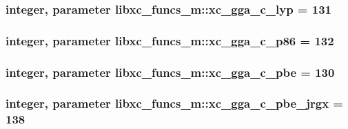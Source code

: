 \hypertarget{classlibxc__funcs__m_a45cb170513b8d6267dfe5b2e2868e75f}{
\subsubsection[{xc\-\_\-gga\-\_\-c\-\_\-lyp}]{\setlength{\rightskip}{0pt plus 5cm}integer, parameter libxc\-\_\-funcs\-\_\-m\-::xc\-\_\-gga\-\_\-c\-\_\-lyp = 131}}\label{classlibxc__funcs__m_a45cb170513b8d6267dfe5b2e2868e75f}
\hypertarget{classlibxc__funcs__m_aedc020b070972d317e7c3eaa07d33b37}{
\subsubsection[{xc\-\_\-gga\-\_\-c\-\_\-p86}]{\setlength{\rightskip}{0pt plus 5cm}integer, parameter libxc\-\_\-funcs\-\_\-m\-::xc\-\_\-gga\-\_\-c\-\_\-p86 = 132}}\label{classlibxc__funcs__m_aedc020b070972d317e7c3eaa07d33b37}
\hypertarget{classlibxc__funcs__m_a4e4708cc4fdcd0bff879f076dcc3fc6d}{
\subsubsection[{xc\-\_\-gga\-\_\-c\-\_\-pbe}]{\setlength{\rightskip}{0pt plus 5cm}integer, parameter libxc\-\_\-funcs\-\_\-m\-::xc\-\_\-gga\-\_\-c\-\_\-pbe = 130}}\label{classlibxc__funcs__m_a4e4708cc4fdcd0bff879f076dcc3fc6d}
\hypertarget{classlibxc__funcs__m_af27116fb422c962bc6f7d5d11b11e908}{
\subsubsection[{xc\-\_\-gga\-\_\-c\-\_\-pbe\-\_\-jrgx}]{\setlength{\rightskip}{0pt plus 5cm}integer, parameter libxc\-\_\-funcs\-\_\-m\-::xc\-\_\-gga\-\_\-c\-\_\-pbe\-\_\-jrgx = 138}}\label{classlibxc__funcs__m_af27116fb422c962bc6f7d5d11b11e908}
